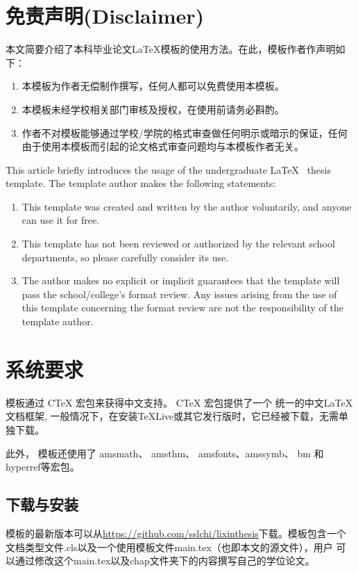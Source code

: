 \section{免责声明(Disclaimer)}
本文简要介绍了本科毕业论文\LaTeX 模板的使用方法。在此，模板作者作声明如下：
\begin{enumerate}
	\item 本模板为作者无偿制作撰写，任何人都可以免费使用本模板。
	\item 本模板未经学校相关部门审核及授权，在使用前请务必斟酌。
	\item 作者不对模板能够通过学校/学院的格式审查做任何明示或暗示的保证，任何由于使用本模板而引起的论文格式审查问题均与本模板作者无关。	
\end{enumerate}

This article briefly introduces the usage of the undergraduate  \LaTeX~ thesis template. The template author makes the following statements:
\begin{enumerate}
    \item This template was created and written by the author voluntarily, and anyone can use it for free.
    \item This template has not been reviewed or authorized by the relevant school departments, so please carefully consider its use.
    \item The author makes no explicit or implicit guarantees that the template will pass the school/college's format review. Any issues arising from the use of this template concerning the format review are not the responsibility of the template author.
\end{enumerate}

\section{系统要求}
模板通过 CTeX 宏包来获得中文支持。 CTeX 宏包提供了一个
统一的中文\LaTeX 文档框架, 一般情况下，在安装TeXLive或其它发行版时，它已经被下载，无需单独下载。

此外， 模板还使用了 amsmath、 amsthm、 amsfonts、amssymb、 bm 和 hyperref等宏包。

\subsection{下载与安装}
模板的最新版本可以从\url{https://github.com/sslchi/lixinthesis}下载。模板包含一个文档类型文件.cls以及一个使用模板文件main.tex（也即本文的源文件），用户
可以通过修改这个main.tex以及chap文件夹下的内容撰写自己的学位论文。


